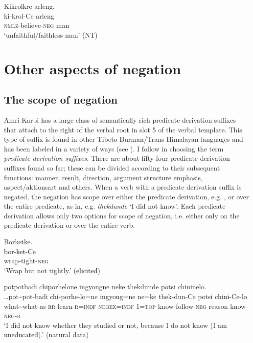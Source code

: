 \documentclass[output=paper,colorlinks,citecolor=brown]{langscibook}
\begin{document}
\ea\label{ex:amr:49} Kikrolkre arleng.\\
    \gll ki-krol-Ce arleng\\
          \textsc{nmlz}{}-believe-\textsc{neg} man\\
    \glt ‘unfaithful/faithless man’ (NT)
\z

\section{Other aspects of negation} \label{sec:amr:4}
\subsection{The scope of negation}\label{sec:amr:4.1} 
Amri Karbi has a large class of semantically rich predicate derivation suffixes that attach to the right of the verbal root in slot 5 of the verbal template. This type of suffix is found in other Tibeto-Burman/Trans-Himalayan languages and has been labeled in a variety of ways (see \citealt{Post2010}). I follow \citet{Post2010} in choosing the term \textit{predicate derivation suffixes}. There are about fifty-four predicate derivation suffixes found so far; these can be divided according to their subsequent functions: manner, result, direction, argument structure emphasis, aspect/aktionsart and others. When a verb with a predicate derivation suffix is negated, the negation has scope over either the predicate derivation, e.g. , or over the entire predicate, as in, e.g.  \textit{thekdunde} ‘I did not know’. Each predicate derivation allows only two options for scope of negation, i.e. either only on the predicate derivation or over the entire verb. 

\ea\label{ex:amr:50}Borketke.\\
    \gll  bor-ket-Ce\\
         wrap-tight-\textsc{neg}\\
    \glt‘Wrap but not tightly.’ (elicited)
\z

\ea\label{ex:amr:51}potpotbadi chiporhelone ingyongne neke thekdunde potsi chininelo.\\
    \gll …pot{\textasciitilde}pot-badi chi-porhe-lo=ne ingyong=ne ne=ke thek-dun-Ce potsi chini-Ce-lo\\
          what{\textasciitilde}what-as \textsc{rr}{}-learn-\textsc{r}=\textsc{indf} \textsc{negex}=\textsc{indf} 1=\textsc{top} know-follow-\textsc{neg} reason know-\textsc{neg}{}-\textsc{r} \\
    \glt ‘I did not know whether they studied or not, because I do not know (I am uneducated).’  (natural data)
\z
\end{document}
